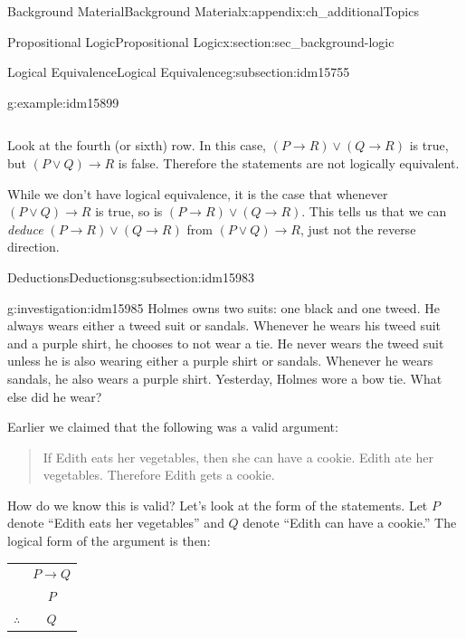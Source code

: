 \documentclass[oneside,10pt,]{book}
\numberwithin{equation}{chapter}
\newcommand{\hrulethin}  {\noalign{\hrule height 0.04em}}
\def\imp{\rightarrow}
\begin{document}
\begin{appendixptx}{Background Material}{}{Background Material}{}{}{x:appendix:ch_additionalTopics}
\begin{sectionptx}{Propositional Logic}{}{Propositional Logic}{}{}{x:section:sec_background-logic}
\begin{subsectionptx}{Logical Equivalence}{}{Logical Equivalence}{}{}{g:subsection:idm15755}
\begin{example}{}{g:example:idm15899}
\begin{sidebyside}{1}{0}{0}{0}
\begin{sbspanel}{1}
{\begin{tabular}{cAcAcBcAc}
\end{tabular}
\par}
\end{sbspanel}%
\end{sidebyside}%
\par
Look at the fourth (or sixth) row. In this case, \((P \imp R) \vee (Q \imp R)\) is true, but \((P \vee Q) \imp R\) is false. Therefore the statements are not logically equivalent.%
\par
While we don't have logical equivalence, it is the case that whenever \((P \vee Q) \imp R\) is true, so is \((P \imp R) \vee (Q \imp R)\).  This tells us that we can \emph{deduce} \((P \imp R) \vee (Q \imp R)\) from \((P \vee Q) \imp R\), just not the reverse direction.%
\end{example}
\end{subsectionptx}
%
%
\typeout{************************************************}
\typeout{************************************************}
%
\begin{subsectionptx}{Deductions}{}{Deductions}{}{}{g:subsection:idm15983}
\begin{investigation}{}{g:investigation:idm15985}%
Holmes owns two suits: one black and one tweed. He always wears either a tweed suit or sandals. Whenever he wears his tweed suit and a purple shirt, he chooses to not wear a tie. He never wears the tweed suit unless he is also wearing either a purple shirt or sandals. Whenever he wears sandals, he also wears a purple shirt. Yesterday, Holmes wore a bow tie. What else did he wear?%
\end{investigation}
Earlier we claimed that the following was a valid argument:%
\begin{quote}%
If Edith eats her vegetables, then she can have a cookie. Edith ate her vegetables. Therefore Edith gets a cookie.%
\end{quote}
How do we know this is valid? Let's look at the form of the statements. Let \(P\) denote ``Edith eats her vegetables'' and \(Q\) denote ``Edith can have a cookie.'' The logical form of the argument is then:%
\begin{sidebyside}{1}{0}{0}{0}%
\begin{sbspanel}{1}%
{\centering%
\begin{tabular}{cc}
&\(P \imp Q\)\tabularnewline[0pt]
&\(P\)\tabularnewline\hrulethin
\(\therefore\)&\(Q\)
\end{tabular}
\par}
\end{sbspanel}%

\end{sidebyside}
\end{subsectionptx}
\end{sectionptx}
\end{appendixptx}
\end{document}
